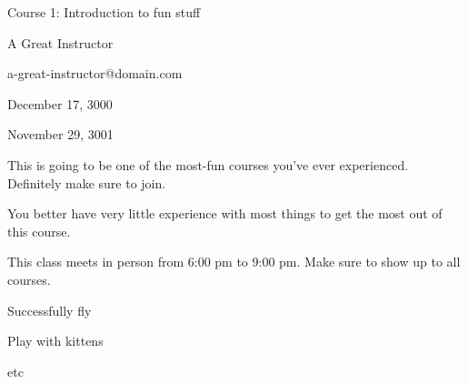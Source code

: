 
Course 1: Introduction to fun stuff

A Great Instructor

a-great-instructor@domain.com

December 17, 3000

November 29, 3001

This is going to be one of the most-fun courses you've ever experienced.
Definitely make sure to join.

You better have very little experience with most things to get the most out of this course.

This class meets in person from 6:00 pm to 9:00 pm. Make sure to show up to all courses.

\item Successfully fly
\item Play with kittens
\item etc

